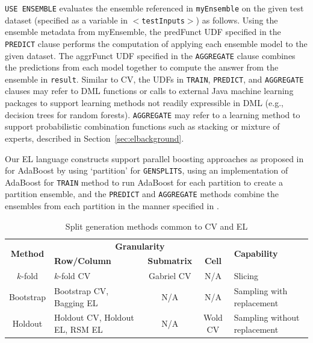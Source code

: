 \documentclass{vldb}
\begin{document}
\begin{center}
\end{center}

{\tt USE ENSEMBLE} evaluates the ensemble referenced in {\tt myEnsemble}
on the given test dataset (specified as a variable in $<${\tt testInputs}$>$)
as follows. Using the ensemble metadata from myEnsemble, the predFunct UDF
specified in the {\tt PREDICT} clause performs the computation of applying
each ensemble model to the given dataset.
The aggrFunct UDF specified in the {\tt AGGREGATE} clause combines the
predictions from each model together to compute the answer from the ensemble in {\tt result}.
Similar to CV, the UDFs in {\tt TRAIN}, {\tt PREDICT}, and {\tt AGGREGATE} clauses
may refer to DML functions or calls to external Java machine learning packages to support
learning methods not readily expressible in DML (e.g., decision trees for random forests).
{\tt AGGREGATE} may refer to a learning method to support probabilistic combination functions
such as stacking or mixture of experts, described in Section~\ref{sec:elbackground}.

Our EL language constructs support parallel boosting approaches as proposed in \cite{parallel-boosting} for AdaBoost by using `partition' for {\tt GENSPLITS},
using an implementation of AdaBoost for {\tt TRAIN} method to run AdaBoost for each partition to create a partition ensemble, and
the {\tt PREDICT} and {\tt AGGREGATE} methods combine the ensembles from each partition in the manner specified in \cite{parallel-boosting}.

\begin{table}[h]
\centering
\begin{tabular}{|c|p{0.9in}|c|c||p{0.9in}|}
\hline
\multirow{2}{*}{\textbf{Method}} & \multicolumn{3}{c||}{\textbf{Granularity}} & \multirow{2}{*}{\textbf{Capability}} \\
\cline{2-4}
 &  {\bf Row/Column} & {\bf Submatrix} & {\bf Cell} & \\
\hline
$k$-fold & $k$-fold CV & Gabriel CV & N/A & Slicing\\
\hline
Bootstrap & Bootstrap CV, Bagging EL & N/A & N/A & Sampling with replacement\\
\hline
Holdout & Holdout CV, Holdout EL, RSM EL & N/A & Wold CV & Sampling without replacement\\
\hline
\end{tabular}
\caption{Split generation methods common to CV and EL}
\label{fig:partition}
\end{table}
\end{document}
